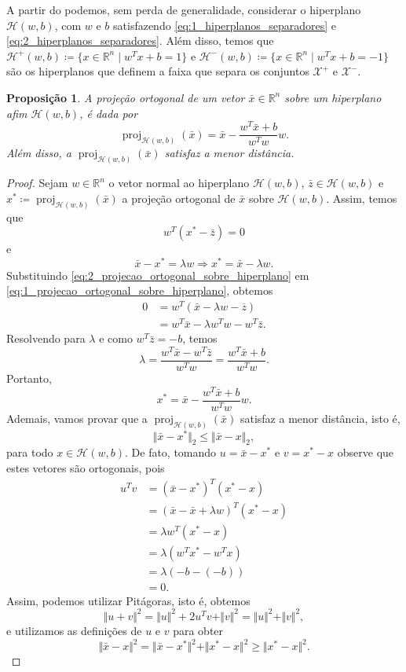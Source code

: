 \documentclass[12pt,a4paper]{scrartcl}
\DeclareMathOperator{\proj}{proj}
\def\Xset{\mathcal{X}}
\def\Hset{\mathcal{H}}
\def\RR{\mathds{R}}
\def\xbar{\bar{x}}
\newtheorem{prop}{Proposição}
\theoremstyle{definition}%
\begin{document}
A partir do  podemos, sem perda de generalidade, considerar o hiperplano $\Hset (w,b)$, com $w$ e $b$ satisfazendo \eqref{eq:1_hiperplanos_separadores} e \eqref{eq:2_hiperplanos_separadores}. Além disso, temos que $\Hset^{+} (w,b) \coloneqq \{x\in \RR^n \mid w^{T}x+b= 1\}$ e $\Hset^{-} (w,b) \coloneqq \{x\in \RR^n \mid w^{T}x+b= -1\}$ são os hiperplanos que definem a faixa que separa os conjuntos $\Xset^{+}$ e $\Xset^{-}$.

\begin{prop} \label{prop:projecao_ortogonal_sobre_hiperplano} 
A projeção ortogonal de um vetor $\xbar\in \RR^n$ sobre um hiperplano afim $\Hset(w,b)$, é dada por
\[ \proj_{\Hset (w,b)}(\xbar)= \xbar - \dfrac{w^{T}\xbar+b}{w^{T}w}w. \]
Além disso, a $\proj_{\Hset (w,b)}(\xbar)$ satisfaz a menor distância.
\end{prop}

\begin{proof}
Sejam $w\in \RR^n$ o vetor normal ao hiperplano $\Hset(w,b)$, $\bar{z}\in \Hset(w,b)$ e $x^{*} \coloneqq \proj_{\Hset (w,b)}(\xbar)$ a projeção ortogonal de $\xbar$ sobre $\Hset(w,b)$. Assim, temos que 
\[ \label{eq:1_projecao_ortogonal_sobre_hiperplano} 
w^{T}(x^{*}-\bar{z})=0 
\]
e
\[ \label{eq:2_projecao_ortogonal_sobre_hiperplano} 
\xbar-x^{*}=\lambda w \Longrightarrow x^{*}=\xbar-\lambda w. 
\]
Substituindo \eqref{eq:2_projecao_ortogonal_sobre_hiperplano} em \eqref{eq:1_projecao_ortogonal_sobre_hiperplano}, obtemos
\begin{align}
0 &= w^{T}(\xbar-\lambda w-\overline{z}) \\
&= w^{T}\xbar-\lambda w^{T}w - w^{T}\bar{z}.
\end{align}
Resolvendo para $\lambda$ e como $w^{T}\bar{z} = -b$, temos
\[ \lambda =\dfrac{w^{T}\xbar-w^{T}\bar{z}}{w^{T}w} =\dfrac{w^{T}\xbar+b}{w^{T}w}. \]
Portanto, 
\[ x^{*}=\xbar-\dfrac{w^{T}\xbar+b}{w^{T}w}w . \]
Ademais, vamos provar que a $\proj_{\Hset (w,b)}(\xbar)$ satisfaz a menor distância, isto é,
\[ \Vert\xbar-x^{*}\Vert_{2} \leq \Vert \xbar-x\Vert_{2}, \]
para todo $x\in \Hset(w,b)$.
De fato, tomando $u=\xbar-x^{*}$ e $v=x^{*}-x$ observe que estes vetores são ortogonais, pois 
\begin{align}
u^{T}v&= (\xbar-x^{*})^{T}(x^{*}-x) \\
&= (\xbar-\xbar+\lambda w)^{T}(x^{*}-x) \\
&= \lambda w^{T}(x^{*}-x) \\
&= \lambda (w^{T}x^{*}-w^{T}x) \\
&= \lambda (-b-(-b)) \\
&= 0.
\end{align}
Assim, podemos utilizar Pitágoras, isto é, obtemos
\[ \Vert u+v\Vert^{2}=\Vert u\Vert^{2} + 2u^{T}v + \Vert v\Vert^{2}=\Vert u\Vert^{2} + \Vert v\Vert^{2} , \]
e utilizamos as definições de $u$ e $v$ para obter
\[ 
\Vert \xbar-x\Vert^{2}=\Vert \xbar-x^{*}\Vert^{2} + \Vert x^{*}-x\Vert^{2} \geq \Vert x^{*} - x \Vert^{2} . 
\]
\end{proof}
\end{document}
